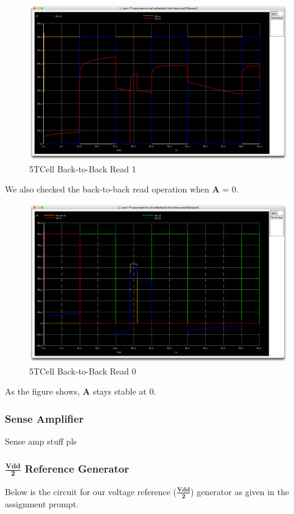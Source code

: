 \documentclass[a4paper]{article}
\begin{document}
 \begin{figure}[H]
	\centering
	\includegraphics[scale=0.12]{5TDoubleRead1}
	\caption{5TCell Back-to-Back Read 1}
	\label{fig:5TBackToBack1}
\end{figure}

We also checked the back-to-back read operation when \textbf{A} = 0.

 \begin{figure}[H]
	\centering
	\includegraphics[scale=0.12]{5TDoubleRead0}
	\caption{5TCell Back-to-Back Read 0}
	\label{fig:5TBackToBack0}
\end{figure}

As the figure shows, \textbf{A} stays stable at 0.

\subsubsection{Sense Amplifier}
Sense amp stuff pls
\subsubsection{$\frac{\textbf{Vdd}}{\textbf{2}}$ Reference Generator}
Below is the circuit for our voltage reference ($\frac{\textbf{Vdd}}{\textbf{2}}$) generator as given in the assignment prompt.
\end{document}
